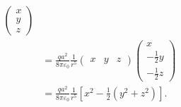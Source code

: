 \begin{example}
\begin{align*}
\begin{pmatrix}
                x\\ y\\ z
            \end{pmatrix}
            \\
            &= \frac{qa^2}{8\pi\varepsilon_0}\frac{1}{r^5}
            \begin{pmatrix}
                x & y & z
            \end{pmatrix}
            \begin{pmatrix}
                x\\ -\frac{1}{2}y\\ -\frac{1}{2}z
            \end{pmatrix}
            \\
            &= \frac{qa^2}{8\pi\varepsilon_0}\frac{1}{r^5}
            \left[x^2 - \frac{1}{2}(y^2 + z^2)\right].
        \end{align*}
    \end{example}
